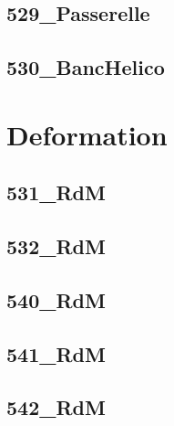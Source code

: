 \subsection{529\_Passerelle}
\graphicspath{{../12-RDM/TD/Cohesion/529_Passerelle/images/}{../12-RDM/TD/Cohesion/529_Passerelle/}{../Style/png/}}


\subsection{530\_BancHelico}
\graphicspath{{../12-RDM/TD/Cohesion/530_BancHelico/images/}{../12-RDM/TD/Cohesion/530_BancHelico/}{../Style/png/}}


\section{Deformation}

\subsection{531\_RdM}
\graphicspath{{../12-RDM/TD/Deformation/531_RdM/images/}{../12-RDM/TD/Deformation/531_RdM/}{../Style/png/}}


\subsection{532\_RdM}
\graphicspath{{../12-RDM/TD/Deformation/532_RdM/images/}{../12-RDM/TD/Deformation/532_RdM/}{../Style/png/}}


\subsection{540\_RdM}
\graphicspath{{../12-RDM/TD/Deformation/540_RdM/images/}{../12-RDM/TD/Deformation/540_RdM/}{../Style/png/}}


\subsection{541\_RdM}
\graphicspath{{../12-RDM/TD/Deformation/541_RdM/images/}{../12-RDM/TD/Deformation/541_RdM/}{../Style/png/}}


\subsection{542\_RdM}
\graphicspath{{../12-RDM/TD/Deformation/542_RdM/images/}{../12-RDM/TD/Deformation/542_RdM/}{../Style/png/}}


